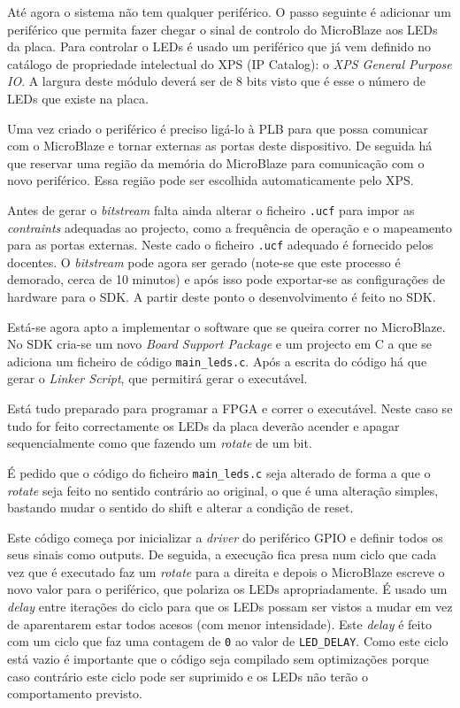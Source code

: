 \documentclass[a4paper,12pt]{article}
\begin{document}
Até agora o sistema não tem qualquer periférico. O passo seguinte é adicionar um periférico que permita fazer chegar o sinal de controlo do MicroBlaze aos LEDs da placa. Para controlar o LEDs é usado um periférico que já vem definido no catálogo de propriedade intelectual do XPS (IP Catalog): o \textit{XPS General Purpose IO}. A largura deste módulo deverá ser de 8 bits visto que é esse o número de LEDs que existe na placa.

Uma vez criado o periférico é preciso ligá-lo à PLB para que possa comunicar com o MicroBlaze e tornar externas as portas deste dispositivo. De seguida há que reservar uma região da memória do MicroBlaze para comunicação com o novo periférico. Essa região pode ser escolhida automaticamente pelo XPS.

Antes de gerar o \textit{bitstream} falta ainda alterar o ficheiro \texttt{.ucf} para impor as \textit{contraints} adequadas ao projecto, como a frequência de operação e o mapeamento para as portas externas. Neste cado o ficheiro \texttt{.ucf} adequado é fornecido pelos docentes. O \textit{bitstream} pode agora ser gerado (note-se que este processo é demorado, cerca de 10 minutos) e após isso pode exportar-se as configurações de hardware para o SDK. A partir deste ponto o desenvolvimento é feito no SDK.

Está-se agora apto a implementar o software que se queira correr no MicroBlaze. No SDK cria-se um novo \textit{Board Support Package} e um projecto em C a que se adiciona um ficheiro de código \texttt{main\_leds.c}. Após a escrita do código há que gerar o \textit{Linker Script}, que permitirá gerar o executável.

Está tudo preparado para programar a FPGA e correr o executável. Neste caso se tudo for feito correctamente os LEDs da placa deverão acender e apagar sequencialmente como que fazendo um \textit{rotate} de um bit.

%

É pedido que o código do ficheiro \texttt{main\_leds.c} seja alterado de forma a que o \textit{rotate} seja feito no sentido contrário ao original, o que é uma alteração simples, bastando mudar o sentido do shift e alterar a condição de reset.  %

Este código começa por inicializar a \textit{driver} do periférico GPIO e definir todos os seus sinais como outputs. De seguida, a execução fica presa num ciclo que cada vez que é executado faz um \textit{rotate} para a direita e depois o MicroBlaze escreve o novo valor para o periférico, que polariza os LEDs apropriadamente. É usado um \textit{delay} entre iterações do ciclo para que os LEDs possam ser vistos a mudar em vez de aparentarem estar todos acesos (com menor intensidade). Este \textit{delay} é feito com um ciclo que faz uma contagem de \texttt{0} ao valor de \texttt{LED\_DELAY}. Como este ciclo está vazio é importante que o código seja compilado sem optimizações porque caso contrário este ciclo pode ser suprimido e os LEDs não terão o comportamento previsto.
\end{document}
